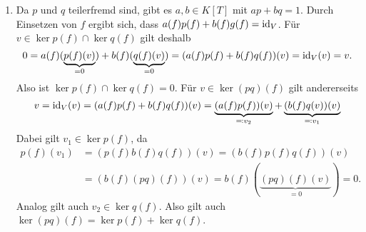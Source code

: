 \begin{solution}
  \begin{enumerate}
    \item
      Da $p$ und $q$ teilerfremd sind, gibt es $a, b \in K[T]$ mit $ap + bq = 1$.
      Durch Einsetzen von $f$ ergibt sich, dass $a(f) p(f) + b(f) g(f) = \operatorname{id}_V$.
      Für $v \in \ker p(f) \cap \ker q(f)$ gilt deshalb
      \[
          0
        =   a(f)( \underbrace{p(f)(v)}_{=0} ) + b(f)( \underbrace{q(f)(v)}_{=0} )
        = (a(f) p(f) + b(f) q(f))(v)
        = \operatorname{id}_V(v)
        = v.
      \]
      Also ist $\ker p(f) \cap \ker q(f) = 0$.
      Für $v \in \ker {(pq)(f)}$ gilt andererseits
      \[
          v
        = \operatorname{id}_V(v)
        = (a(f) p(f) + b(f) q(f))(v)
        = \underbrace{(a(f)p(f))(v)}_{\eqqcolon v_2} + \underbrace{(b(f)q(v))(v)}_{\eqqcolon v_1}
      \]
      Dabei gilt $v_1 \in \ker p(f)$, da
      \begin{align*}
            p(f)(v_1)
        &=  (p(f)b(f)q(f))(v)
         =  (b(f)p(f)q(f))(v)
        \\
        &=  (b(f)(pq)(f))(v)
         =  b(f)( \underbrace{(pq)(f)(v)}_{=0} )
         =  0.
      \end{align*}
      Analog gilt auch $v_2 \in \ker q(f)$.
      Also gilt auch $\ker {(pq)(f)} = \ker p(f) + \ker q(f)$.
      

\end{enumerate}
\end{solution}
